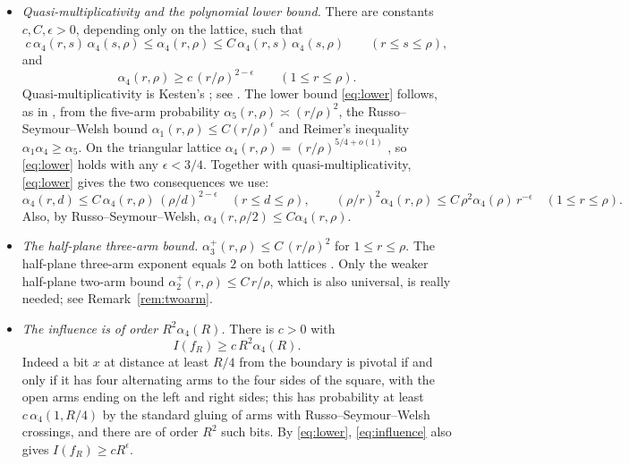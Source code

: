\documentclass[11pt]{amsart}
\theoremstyle{remark}
\begin{document}
\begin{itemize}
\item[(F1)] \emph{Quasi-multiplicativity and the polynomial lower bound.} There are constants $c,C,\epsilon>0$, depending only on the lattice, such that
\[
c\,\alpha_4(r,s)\,\alpha_4(s,\rho)\le\alpha_4(r,\rho)\le C\,\alpha_4(r,s)\,\alpha_4(s,\rho)\qquad(r\le s\le\rho),
\]
and
\begin{equation}\label{eq:lower}
\alpha_4(r,\rho)\ge c\,(r/\rho)^{2-\epsilon}\qquad(1\le r\le\rho).
\end{equation}
Quasi-multiplicativity is Kesten's \cite{Kes87}; see \cite[Section~4]{Nol08}. The lower bound \eqref{eq:lower} follows, as in \cite[(2.6)]{GPS10}, from the five-arm probability $\alpha_5(r,\rho)\asymp(r/\rho)^2$, the Russo--Seymour--Welsh bound $\alpha_1(r,\rho)\le C(r/\rho)^{\epsilon}$ and Reimer's inequality $\alpha_1\alpha_4\ge\alpha_5$. On the triangular lattice $\alpha_4(r,\rho)=(r/\rho)^{5/4+o(1)}$ \cite{SW01}, so \eqref{eq:lower} holds with any $\epsilon<3/4$. Together with quasi-multiplicativity, \eqref{eq:lower} gives the two consequences we use:
\begin{equation}\label{eq:qm1}
\alpha_4(r,d)\le C\,\alpha_4(r,\rho)\,(\rho/d)^{2-\epsilon}\quad(r\le d\le\rho),\qquad
(\rho/r)^2\alpha_4(r,\rho)\le C\,\rho^2\alpha_4(\rho)\,r^{-\epsilon}\quad(1\le r\le\rho).
\end{equation}
Also, by Russo--Seymour--Welsh, $\alpha_4(r,\rho/2)\le C\alpha_4(r,\rho)$.
\item[(F2)] \emph{The half-plane three-arm bound.} $\alpha_3^+(r,\rho)\le C\,(r/\rho)^2$ for $1\le r\le\rho$. The half-plane three-arm exponent equals $2$ on both lattices \cite{Nol08}. Only the weaker half-plane two-arm bound $\alpha_2^+(r,\rho)\le C\,r/\rho$, which is also universal, is really needed; see Remark~\ref{rem:twoarm}.
\item[(F3)] \emph{The influence is of order $R^2\alpha_4(R)$.} There is $c>0$ with
\begin{equation}\label{eq:influence}
I(f_R)\ge c\,R^2\alpha_4(R).
\end{equation}
Indeed a bit $x$ at distance at least $R/4$ from the boundary is pivotal if and only if it has four alternating arms to the four sides of the square, with the open arms ending on the left and right sides; this has probability at least $c\,\alpha_4(1,R/4)$ by the standard gluing of arms with Russo--Seymour--Welsh crossings, and there are of order $R^2$ such bits. By \eqref{eq:lower}, \eqref{eq:influence} also gives $I(f_R)\ge c R^{\epsilon}$.
\end{itemize}
\end{document}
